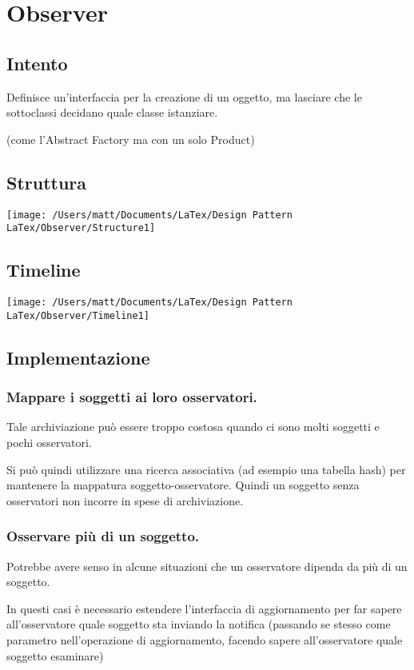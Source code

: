 \chapter{Observer}
\section{Intento}

Definisce un'interfaccia per la creazione di un oggetto, ma lasciare che le sottoclassi decidano quale classe istanziare.

(come l'Abstract Factory ma con un solo Product)


\section{Struttura}

\texttt{[image: /Users/matt/Documents/LaTex/Design Pattern LaTex/Observer/Structure1]}


\section{Timeline}

\texttt{[image: /Users/matt/Documents/LaTex/Design Pattern LaTex/Observer/Timeline1]}


\section{Implementazione}

\subsection{Mappare i soggetti ai loro osservatori.}
Tale archiviazione può essere troppo costosa quando ci sono molti soggetti e pochi osservatori.

Si può quindi utilizzare una ricerca associativa (ad esempio una tabella hash) per mantenere la mappatura soggetto-osservatore. Quindi un soggetto senza osservatori non incorre in spese di archiviazione.

\subsection{Osservare più di un soggetto.}
Potrebbe avere senso in alcune situazioni che un osservatore dipenda da più di un soggetto. 

In questi casi è necessario estendere l'interfaccia di aggiornamento per far sapere all'osservatore quale soggetto sta inviando la notifica (passando se stesso come parametro nell'operazione di aggiornamento, facendo sapere all'osservatore quale soggetto esaminare)


